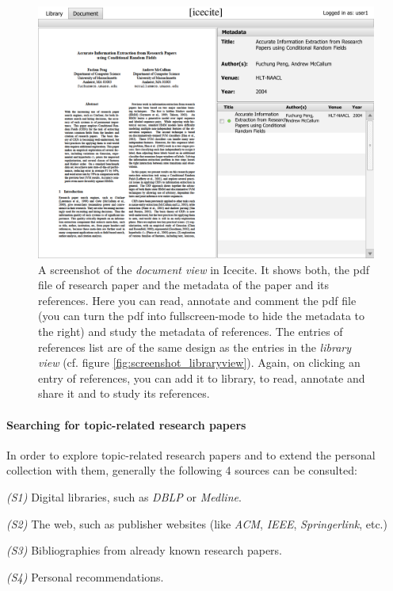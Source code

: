 \begin{figure}[ht]
  \includegraphics[width=\textwidth]{./figures/documentview}
  \caption{A screenshot of the \textit{document view} in Icecite. It shows both, the pdf file of research paper and the metadata of the paper and its references. Here you can read, annotate and comment the pdf file (you can turn the pdf into fullscreen-mode to hide the metadata to the right) and study the metadata of references. The entries of references list are of the same design as the entries in the \textit{library view} (cf. figure \ref{fig:screenshot_libraryview}). Again, on clicking an entry of references, you can add it to library, to read, annotate and share it and to study its references.}
  \label{fig:screenshot_documentview}
\end{figure}

\paragraph{Searching for topic-related research papers} 
\noindent
In order to explore topic-related research papers and to extend the personal collection with them, generally the following 4 sources can be consulted:

\par\medskip\noindent
\textit{(S1)} Digital libraries, such as \textit{DBLP} or \textit{Medline}.
\par\smallskip\noindent
\textit{(S2)} The web, such as publisher websites (like \textit{ACM}, \textit{IEEE}, \textit{Springerlink}, etc.)
\par\smallskip\noindent
\textit{(S3)} Bibliographies from already known research papers.
\par\smallskip\noindent
\textit{(S4)} Personal recommendations.
\medskip


